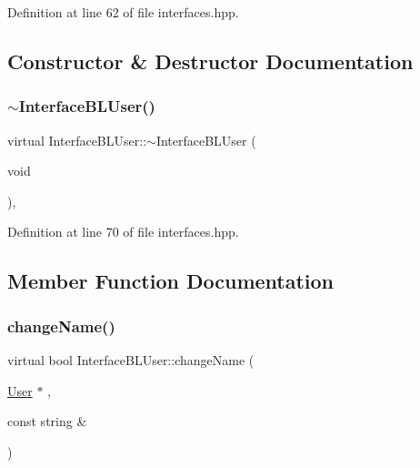 Definition at line 62 of file interfaces.\+hpp.



\subsection{Constructor \& Destructor Documentation}
\mbox{\label{class_interface_b_l_user_aa48647da4d55e385e5cead19becc1b65}} 
\subsubsection{\texorpdfstring{$\sim$\+Interface\+B\+L\+User()}{~InterfaceBLUser()}}
{\footnotesize\ttfamily virtual Interface\+B\+L\+User\+::$\sim$\+Interface\+B\+L\+User (\begin{DoxyParamCaption}\item[{void}]{ }\end{DoxyParamCaption})\hspace{0.3cm}{\ttfamily [inline]}, {\ttfamily [virtual]}}



Definition at line 70 of file interfaces.\+hpp.



\subsection{Member Function Documentation}
\mbox{\label{class_interface_b_l_user_a6bb394145d7e0f97902dcc2570919bb0}} 
\subsubsection{\texorpdfstring{change\+Name()}{changeName()}}
{\footnotesize\ttfamily virtual bool Interface\+B\+L\+User\+::change\+Name (\begin{DoxyParamCaption}\item[{\hyperlink{class_user}{User} $\ast$}]{,  }\item[{const string \&}]{ }\end{DoxyParamCaption})\hspace{0.3cm}{\ttfamily [pure virtual]}}



